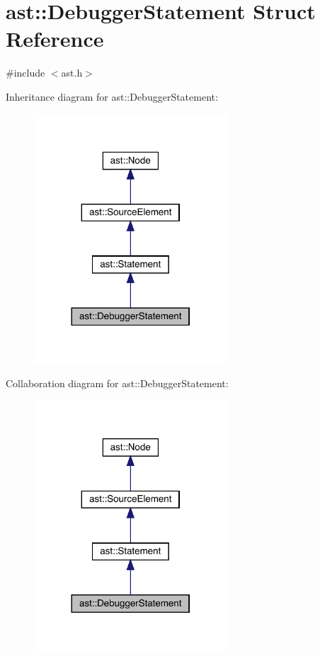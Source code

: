 \hypertarget{structast_1_1_debugger_statement}{}\section{ast\+:\+:Debugger\+Statement Struct Reference}
\label{structast_1_1_debugger_statement}


{\ttfamily \#include $<$ast.\+h$>$}



Inheritance diagram for ast\+:\+:Debugger\+Statement\+:\nopagebreak
\begin{figure}[H]
\begin{center}
\leavevmode
\includegraphics[width=204pt]{structast_1_1_debugger_statement__inherit__graph}
\end{center}
\end{figure}


Collaboration diagram for ast\+:\+:Debugger\+Statement\+:\nopagebreak
\begin{figure}[H]
\begin{center}
\leavevmode
\includegraphics[width=204pt]{structast_1_1_debugger_statement__coll__graph}
\end{center}
\end{figure}
